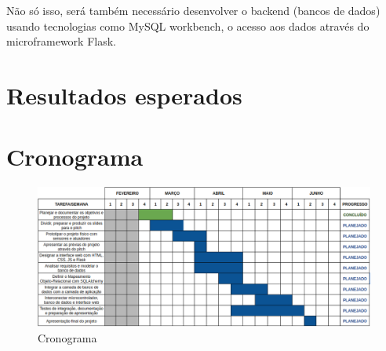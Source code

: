 \documentclass[11pt]{article}
\begin{document}
Não só isso, será também necessário desenvolver o backend (bancos de dados) usando tecnologias como MySQL workbench, o acesso aos dados através do microframework Flask.
\section{Resultados esperados}
\section{Cronograma}

\begin{figure}[H]
    \centering
    \includegraphics[width=0.9\linewidth]{cronograma.png}
    \caption{Cronograma}
\end{figure}



\end{document}
